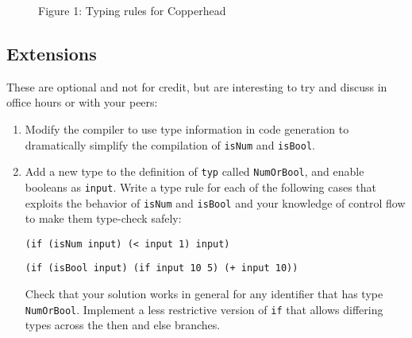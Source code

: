 \documentclass[10pt, oneside]{article}
\begin{document}
\begin{figure}
\caption{Figure 1: Typing rules for Copperhead}
\end{figure}


\subsection*{Extensions}

These are optional and not for credit, but are interesting to try and discuss
in office hours or with your peers:

\begin{enumerate}

\item Modify the compiler to use type information in code generation to
dramatically simplify the compilation of \texttt{isNum} and \texttt{isBool}.

\item Add a new type to the definition of \texttt{typ} called
\texttt{NumOrBool}, and enable booleans as \texttt{input}. Write a type rule
for each of the following cases that exploits the behavior of \texttt{isNum}
and \texttt{isBool} and your knowledge of control flow to make them
type-check safely:

\texttt{(if (isNum input) (< input 1) input)}

\texttt{(if (isBool input) (if input 10 5) (+ input 10))}

Check that your solution works in general for any identifier that has type
\texttt{NumOrBool}. Implement a less restrictive version of \texttt{if} that
allows differing types across the then and else branches.

\end{enumerate}
\end{document}
